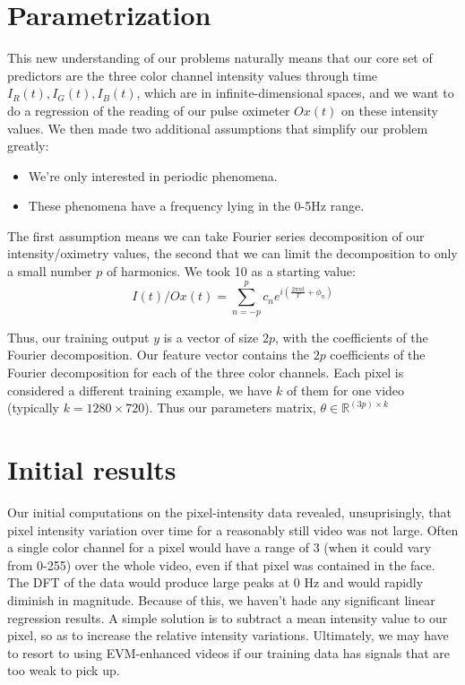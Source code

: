 \documentclass[12pt]{article}
\begin{document}
\section{Parametrization}
  This new understanding of our problems naturally means that our core set of predictors are the three color channel intensity values through
  time \(I_R(t), I_G(t), I_B(t)\), which are in infinite-dimensional spaces, and we want to do a regression of the reading of our pulse oximeter $Ox(t)$ 
  on these intensity values.
  We then made two additional assumptions that simplify our problem greatly:
  \begin{itemize}
    \item We're only interested in periodic phenomena.
    \item These phenomena have a frequency lying in the 0-5Hz range.
  \end{itemize}

  The first assumption means we can take Fourier series decomposition of our intensity/oximetry values, the second that we can
  limit the decomposition to only a small number $p$ of harmonics. We took 10 as a starting value:
  \[
    I(t)/Ox(t) = \sum_{n=-p}^{p} c_n e^{i \left(\frac{2\pi nt}{T}  + \phi_n \right) }
  \]

  Thus, our training output $y$ is a vector of size $2p$, with the coefficients of the Fourier decomposition.
  Our feature vector contains the $2p$ coefficients of the Fourier decomposition for each of the three color channels.
  Each pixel is considered a different training example, we have $k$ of them for one video (typically \(k=1280\times 720\)).
  Thus our parameters matrix, $\theta \in \mathbb{R}^{(3p) \times k}$


\section{Initial results}
  Our initial computations on the pixel-intensity data revealed, unsuprisingly,
  that pixel intensity variation over time for a reasonably still video was not large.
  Often a single color channel for a pixel would have a range of 3 (when it could vary from 0-255) over the whole video, even if that pixel was contained in the face.
  The DFT of the data would produce large peaks at 0 Hz and would rapidly diminish in magnitude. Because of this, we haven't hade any significant linear regression results.
  A simple solution is to subtract a mean intensity value to our pixel, so as to increase the relative intensity variations.
  Ultimately, we may have to resort to using EVM-enhanced videos if our training data has signals that are too weak to pick up.


\end{document}
